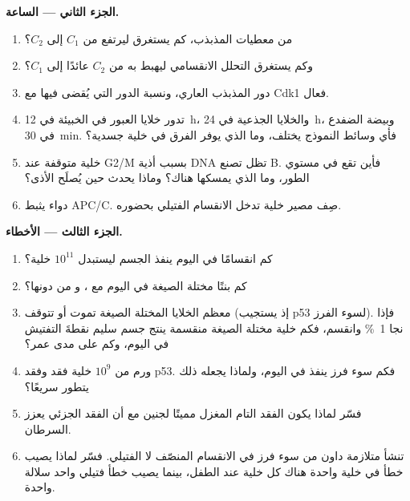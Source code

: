 \begin{problem}
\medskip
\noindent\textbf{الجزء الثاني --- الساعة.}
\begin{enumerate}[resume]
  \item من معطيات المذبذب، كم يستغرق  ليرتفع
        من $C_{1}$ إلى $C_{2}$؟
  \item وكم يستغرق التحلل الانقسامي ليهبط به من $C_{2}$
        عائدًا إلى $C_{1}$؟
  \item دور المذبذب العاري، ونسبة الدور التي يُقضى فيها
        مع Cdk1 فعال.
  \item تدور خلايا العبور في الخبيئة في \qty{12}{h}، والخلايا الجذعية
        في \qty{24}{h}، وبيضة الضفدع في \qty{30}{min}. فأي وسائط
        النموذج يختلف، وما الذي يوفر
        الفرق في خلية جسدية؟
  \item خلية متوقفة عند  G2/M بسبب أذية DNA تظل
        تصنع  B. فأين تقع في مستوي الطور، وما الذي
        يمسكها هناك؟ وماذا يحدث حين يُصلَح الأذى؟
  \item دواء يثبط APC/C. صِف مصير خلية تدخل
        الانقسام الفتيلي بحضوره.
\end{enumerate}

\medskip
\noindent\textbf{الجزء الثالث --- الأخطاء.}
\begin{enumerate}[resume]
  \item كم انقسامًا في اليوم ينفذ الجسم ليستبدل
        $10^{11}$ خلية؟
  \item كم بنتًا مختلة الصيغة في اليوم مع ، و
        من دونها؟
  \item معظم الخلايا المختلة الصيغة تموت أو تتوقف (إذ يستجيب p53
        لسوء الفرز). فإذا نجا \qty{1}{\%} وانقسم، فكم خلية
        مختلة الصيغة منقسمة ينتج جسم سليم نقطةَ التفتيش
        في اليوم، وكم على مدى عمر؟
  \item ورم من $10^{9}$ خلية فقد  وفقد p53.
        فكم سوء فرز ينفذ في اليوم، ولماذا يجعله
        ذلك يتطور سريعًا؟
  \item فسّر لماذا يكون الفقد التام  المغزل
        مميتًا لجنين مع أن الفقد الجزئي يعزز السرطان.
  \item تنشأ متلازمة داون من سوء فرز في الانقسام المنصّف لا
        الفتيلي. فسّر لماذا يصيب خطأ في خلية واحدة هناك كل
        خلية عند الطفل، بينما يصيب خطأ فتيلي واحد سلالة واحدة.
\end{enumerate}


\end{problem}
